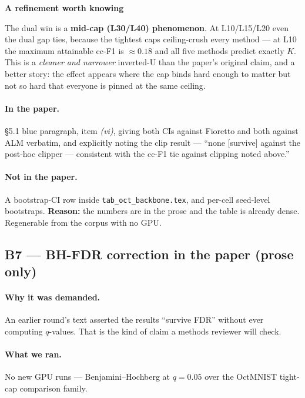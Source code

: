 \documentclass[11pt,a4paper]{article}
\newenvironment{callout}[1]
  {\par\medskip\noindent\begin{lrbox}{\calloutbox}%
   \begin{minipage}{\dimexpr\linewidth-20pt\relax}%
   \textbf{#1}\par\smallskip}
  {\end{minipage}\end{lrbox}%
   \setlength{\fboxsep}{10pt}%
   \colorbox{boxgrey}{\usebox{\calloutbox}}\par\medskip}
\begin{document}
\begin{callout}{A refinement worth knowing}
The dual win is a \textbf{mid-cap (L30/L40) phenomenon}. At L10/L15/L20 even the dual gap ties,
because the tightest caps ceiling-crush every method --- at L10 the maximum attainable cc-F1 is
$\approx 0.18$ and all five methods predict exactly $K$. This is a \emph{cleaner and narrower}
inverted-U than the paper's original claim, and a better story: the effect appears where the cap
binds hard enough to matter but not so hard that everyone is pinned at the same ceiling.
\end{callout}

\paragraph{In the paper.} \S5.1 blue paragraph, item \emph{(vi)}, giving both CIs against Fioretto
and both against ALM verbatim, and explicitly noting the clip result --- ``none [survive] against
the post-hoc clipper --- consistent with the cc-F1 tie against clipping noted above.''

\paragraph{Not in the paper.} A bootstrap-CI row inside \texttt{tab\_oct\_backbone.tex}, and
per-cell seed-level bootstraps. \textbf{Reason:} the numbers are in the prose and the table is
already dense. Regenerable from the corpus with no GPU.

\subsection*{B7 --- BH-FDR correction
\hfill\normalsize\textcolor{okgreen}{\textbf{in the paper (prose only)}}}

\paragraph{Why it was demanded.} An earlier round's text asserted the results ``survive FDR''
without ever computing $q$-values. That is the kind of claim a methods reviewer will check.

\paragraph{What we ran.} No new GPU runs --- Benjamini--Hochberg at $q{=}0.05$ over the OctMNIST
tight-cap comparison family.
\end{document}
